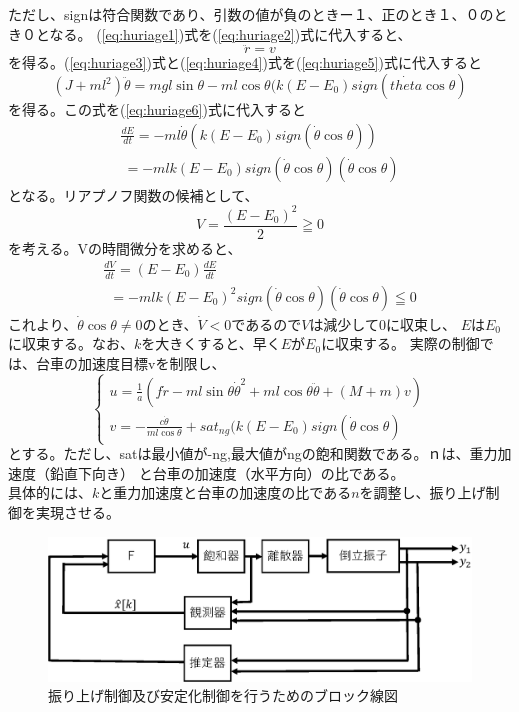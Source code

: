 	ただし、signは符合関数であり、引数の値が負のときー１、正のとき１、０のとき０となる。
	(\ref{eq:huriage1})式を(\ref{eq:huriage2})式に代入すると、
	\begin{equation}
		\ddot{r} = v
		\label{eq:huriage3}
	\end{equation}
	を得る。(\ref{eq:huriage3})式と(\ref{eq:huriage4})式を(\ref{eq:huriage5})式に代入すると
	\begin{equation}
		(J+ml^{2})\ddot{\theta} = mgl\sin{\theta}-ml\cos{\theta}(k(E-E_{0})sign(\dot{theta}\cos{\theta})
	\end{equation}
	を得る。この式を(\ref{eq:huriage6})式に代入すると
	\begin{equation}
		\begin{array}{l}
			\frac{dE}{dt} = -ml\dot{\theta}(k(E-E_{0})sign(\dot{\theta}\cos{\theta}))\\
			\ = -mlk(E-E_{0})sign(\dot{\theta}\cos{\theta})(\dot{\theta}\cos{\theta})
		\end{array}
	\end{equation}
	となる。リアプノフ関数の候補として、
	\begin{equation}
		V = \frac{(E-E_{0})^{2}}{2}≧0
	\end{equation}
	を考える。Vの時間微分を求めると、
	\begin{equation}
		\begin{array}{l}
			\frac{dV}{dt} = (E - E_{0})\frac{dE}{dt}\\
			\ \ = -mlk(E-E_{0})^{2}sign(\dot{\theta}\cos{\theta})(\dot{\theta}\cos{\theta})≦0
		\end{array}
	\end{equation}
	これより、$\dot{\theta}\cos{\theta}≠0$のとき、$\dot{V}<0$であるので$V$は減少して$0$に収束し、
	$E$は$E_0$に収束する。なお、$k$を大きくすると、早く$E$が$E_0$に収束する。
	実際の制御では、台車の加速度目標vを制限し、
	\begin{equation}
		\left\{
		\begin{array}{l}
			u = \frac{1}{a}\left(f\dot{r} - ml\sin{\theta}\dot{\theta}^2 + ml\cos{\theta}\ddot{\theta}+(M+m)v \right)\\
			v = -\frac{c\dot{\theta}}{ml\cos{\theta}}+sat_{ng}(k(E-E_{0})sign(\dot{\theta}\cos{\theta})
		\end{array}
		\right.
	\end{equation}
	とする。ただし、satは最小値が-ng,最大値がngの飽和関数である。ｎは、重力加速度（鉛直下向き）
	と台車の加速度（水平方向）の比である。\\
	具体的には、$k$と重力加速度と台車の加速度の比である$n$を調整し、振り上げ制御を実現させる。
	\begin{figure}[H]
		\centering
		\includegraphics[width=0.8\linewidth]{gazo/controll_huriage.eps}
		\caption{振り上げ制御及び安定化制御を行うためのブロック線図}
		\label{image:cHURIAGE}
	\end{figure}


